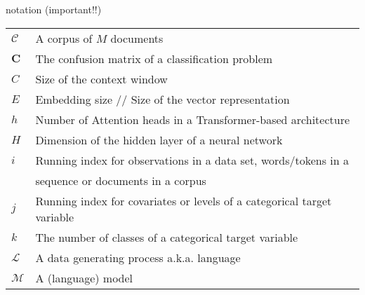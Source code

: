 
\endlecture



\begin{vbframe}{notation (important!!)}

\vfill

\begin{tabular}{ll}
        $\mathcal{C}$ & A corpus of $M$ documents\\[.5em]
        $\mathbf{C}$ & The confusion matrix of a classification problem\\[.5em]
        $C$ & Size of the context window\\[.5em]
        $E$ & Embedding size // Size of the vector representation\\[.5em]
        $h$ & Number of Attention heads in a Transformer-based architecture\\[.5em]
        $H$ & Dimension of the hidden layer of a neural network\\[.5em]
        $i$ & Running index for observations in a data set, words/tokens in a\\
            & sequence or documents in a corpus\\[.5em]
        $j$ & Running index for covariates or levels of a categorical target variable\\[.5em]
        $k$ & The number of classes of a categorical target variable\\[.5em]
        $\mathcal{L}$ & A data generating process a.k.a. language\\[.5em]
        $\mathcal{M}$ & A (language) model\\[.5em]
\end{tabular}

\vfill

\end{vbframe}


